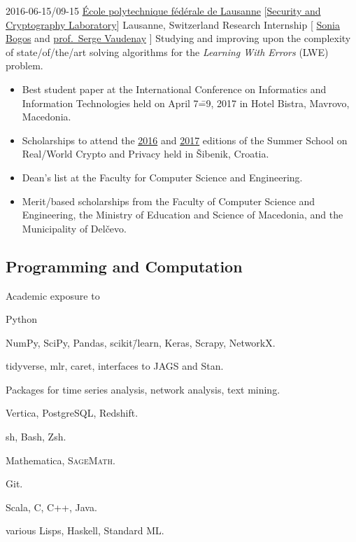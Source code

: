\documentclass[version=last, paper=A4, DIV=12, toc=bibliography]{scrartcl}%
\begin{document}
\WorkEntry%
{2016-06-15/09-15}%
{\href{https://epfl.ch/}{École polytechnique fédérale de Lausanne}}%
[\href{https://lasec.epfl.ch/}{Security and Cryptography Laboratory}]%
{Lausanne, Switzerland}%
{Research Internship}%
[%
\href{https://lasec.epfl.ch/~bogos/}{Sonia Bogos} and
\href{https://lasec.epfl.ch/~vaudenay/}{prof.\ Serge Vaudenay}%
]%
{%
  Studying and improving upon the complexity of state\-/of\-/the\-/art solving
  algorithms for the \emph{Learning With Errors} (LWE) problem.%
}

\label{sec:honors-achievements}

\begin{itemize}
\item Best student paper at the  International Conference on Informatics
  and Information Technologies held on April 7\==9, 2017 in Hotel Bistra,
  Mavrovo, Macedonia.
\item Scholarships to attend the
  \href{http://summerschool-croatia.cs.ru.nl/2016/}{2016} and
  \href{http://summerschool-croatia.cs.ru.nl/2017/}{2017} editions of the Summer
  School on Real\-/World Crypto and Privacy held in Šibenik, Croatia.
\item Dean's list at the Faculty for Computer Science and Engineering.
\item Merit\-/based scholarships from the Faculty of Computer Science and
  Engineering, the Ministry of Education and Science of Macedonia, and the
  Municipality of Delčevo.
\end{itemize}

\label{sec:skills}

\subsection*{Programming and
  Computation}\label{subsec:programming-computation}

\begingroup
{}%
\begin{labeling}[~\==]{Academic exposure to}
\item[Proficient with]
  \begingroup
  \begin{labeling}[~\==]{Python}
  \item[Python] NumPy, SciPy, Pandas, scikit\=/learn, Keras, Scrapy, NetworkX.
  \item[R] tidyverse, mlr, caret, interfaces to JAGS and Stan.

    Packages for time series analysis, network analysis, text mining.
  \item[SQL] Vertica, PostgreSQL, Redshift.
  \item[Shell] sh, Bash, Zsh.
  \item[CAS] Mathematica, \textsc{SageMath}.
  \item[(D)VCS] Git.%
  \end{labeling}
  \endgroup
\item[Familiar with] Scala, C, C++, Java.
\item[Academic exposure to] various Lisps, Haskell, Standard ML\@.
\end{labeling}
\endgroup
\end{document}
